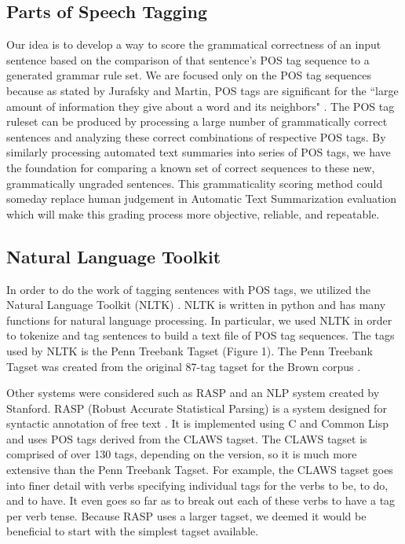 \documentclass[11pt,a4paper]{article}
\begin{document}
\begin{multicols}{2}
\section{Parts of Speech Tagging}
Our idea is to develop a way to score the grammatical correctness of an input sentence based on the comparison of that sentence's POS tag sequence to a generated grammar rule set. We are focused only on the POS tag sequences because as stated by Jurafsky and Martin, POS tags are significant for the ``large amount of information they give about a word and its neighbors" \cite{jurafsky}. The POS tag ruleset can be produced by processing a large number of grammatically correct sentences and analyzing these correct combinations of respective POS tags. By similarly processing automated text summaries into series of POS tags, we have the foundation for comparing a known set of correct sequences to these new, grammatically ungraded sentences. This grammaticality scoring method could someday replace human judgement in Automatic Text Summarization evaluation which will make this grading process more objective, reliable, and repeatable.


\subsection{Natural Language Toolkit}

In order to do the work of tagging sentences with POS tags, we utilized the Natural Language Toolkit (NLTK) \cite{nltk}. NLTK is written in python and has many functions for natural language processing. In particular, we used NLTK in order to tokenize and tag sentences to build a text file of POS tag sequences. The tags used by NLTK is the Penn Treebank Tagset (Figure 1). The Penn Treebank Tagset was created from the original 87-tag tagset for the Brown corpus \cite{jurafsky}.

Other systems were considered such as RASP and an NLP system created by Stanford. RASP (Robust Accurate Statistical Parsing) is a system designed for syntactic annotation of free text \cite{briscoe}. It is implemented using C and Common Lisp and uses POS tags derived from the CLAWS tagset. The CLAWS tagset is comprised of over 130 tags, depending on the version, so it is much more extensive than the Penn Treebank Tagset. For example, the CLAWS tagset goes into finer detail with verbs specifying individual tags for the verbs to be, to do, and to have. It even goes so far as to break out each of these verbs to have a tag per verb tense. Because RASP uses a larger tagset, we deemed it would be beneficial to start with the simplest tagset available.


\end{multicols}
\end{document}
